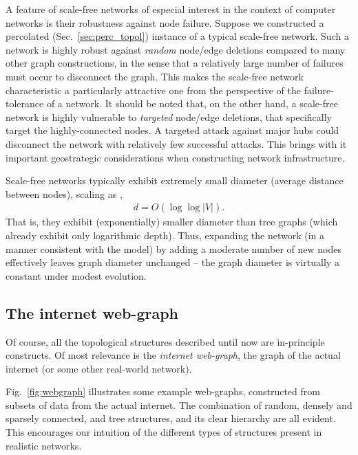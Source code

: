 A feature of scale-free networks of especial interest in the context of computer networks is their robustness against node failure. Suppose we constructed a percolated (Sec.~\ref{sec:perc_topol}) instance of a typical scale-free network. Such a network is highly robust against \textit{random} node/edge deletions compared to many other graph constructions, in the sense that a relatively large number of failures must occur to disconnect the graph. This makes the scale-free network characteristic a particularly attractive one from the perspective of the failure-tolerance of a network. It should be noted that, on the other hand, a scale-free network is highly vulnerable to \textit{targeted} node/edge deletions, that specifically target the highly-connected nodes. A targeted attack against major hubs could disconnect the network with relatively few successful attacks. This brings with it important geostrategic considerations when constructing network infrastructure.

Scale-free networks typically exhibit extremely small diameter (average distance between nodes), scaling as \cite{bib:PhysRevLett.90.058701},
\begin{align}
	d = O(\log \log |V|).
\end{align}
That is, they exhibit (exponentially) smaller diameter than tree graphs (which already exhibit only logarithmic depth). Thus, expanding the network (in a manner consistent with the model) by adding a moderate number of new nodes effectively leaves graph diameter unchanged -- the graph diameter is virtually a constant under modest evolution.

%
%

\subsection{The internet web-graph} 

Of course, all the topological structures described until now are in-principle constructs. Of most relevance is the \textit{internet web-graph}, the graph of the actual internet (or some other real-world network).

Fig.~\ref{fig:webgraph} illustrates some example web-graphs, constructed from subsets of data from the actual internet. The combination of random, densely and sparsely connected, and tree structures, and its clear hierarchy are all evident. This encourages our intuition of the different types of structures present in realistic networks.

